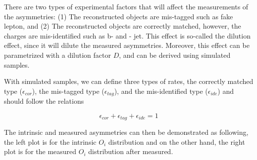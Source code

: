 There are two types of experimental factors that will affect the measurements of the asymmetries: (1) The reconstructed objects are mis-tagged such as fake lepton, and (2) The reconstructed objects are correctly matched, however, the charges are mis-identified such as b- and \PAQb- jet.
This effect is so-called the dilution effect, since it will dilute the measured asymmetries. 
Moreover, this effect can be parametrized with a dilution factor $D$, and can be derived using \ttbar simulated samples.

With \ttbar simulated samples, we can define three types of rates, the correctly matched type ($\epsilon_{cor}$), the mis-tagged type ($\epsilon_{tag}$), and the mis-identified type ($\epsilon_{ide}$) and should follow the relations

\begin{equation}\label{eq:epsilon_sum}
    \epsilon_{cor} + \epsilon_{tag} + \epsilon_{ide} = 1
\end{equation}

The intrinsic and measured asymmetries can then be demonstrated as following, the left plot is for the intrinsic $O_{i}$ distribution and on the other hand, the right plot is for the measured $O_{i}$ distribution after measured.

